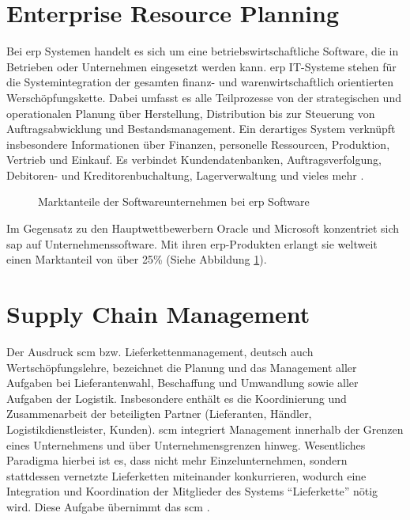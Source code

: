 \section{Enterprise Resource Planning}
\label{sec:erp-definition}
Bei \gls{erp} Systemen handelt es sich um eine betriebswirtschaftliche Software, die in Betrieben oder Unternehmen eingesetzt werden kann. \gls{erp} IT-Systeme stehen für die Systemintegration der gesamten finanz- und warenwirtschaftlich orientierten Werschöpfungskette. Dabei umfasst es alle Teilprozesse von der strategischen und operationalen Planung über Herstellung, Distribution bis zur Steuerung von Auftragsabwicklung und Bestandsmanagement. Ein derartiges System verknüpft insbesondere Informationen über Finanzen, personelle Ressourcen, Produktion, Vertrieb und Einkauf. Es verbindet Kundendatenbanken, Auftragsverfolgung, Debitoren- und Kreditorenbuchaltung, Lagerverwaltung und vieles mehr \cite{ERPDefinition}.

\begin{figure}[h]
  \centering 
  \caption{Marktanteile der Softwareunternehmen bei \gls{erp} Software} 
  \label{abb:SAPMarktanteil} 
\end{figure} 

Im Gegensatz zu den Hauptwettbewerbern Oracle und Microsoft konzentriet sich \gls{sap} auf Unternehmenssoftware. Mit ihren \gls{erp}-Produkten erlangt sie weltweit einen Marktanteil von über 25\% (Siehe Abbildung \ref{abb:SAPMarktanteil}).

\section{Supply Chain Management}
\label{sec:scm-definition}
Der Ausdruck \gls{scm} bzw. Lieferkettenmanagement, deutsch auch Wertschöpfungslehre, bezeichnet die Planung und das Management aller Aufgaben bei Lieferantenwahl, Beschaffung und Umwandlung sowie aller Aufgaben der Logistik. Insbesondere enthält es die Koordinierung und Zusammenarbeit der beteiligten Partner (Lieferanten, Händler, Logistikdienstleister, Kunden). \gls{scm} integriert Management innerhalb der Grenzen eines Unternehmens und über Unternehmensgrenzen hinweg. Wesentliches Paradigma hierbei ist es, dass nicht mehr Einzelunternehmen, sondern stattdessen vernetzte Lieferketten miteinander konkurrieren, wodurch eine Integration und Koordination der Mitglieder des Systems "`Lieferkette"' nötig wird. Diese Aufgabe übernimmt das \gls{scm} \cite{SCMDefinition}.

